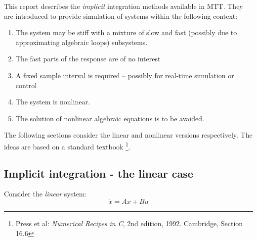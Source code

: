 

This report describes the \emph{implicit} integration methods
available in MTT. They are introduced to provide  simulation
of systems within the following context:
\begin{enumerate}
\item The system may be stiff with a mixture of slow and fast
  (possibly due to approximating algebraic loops) subsystems.
\item The fast parts of the response are of no interest
\item A fixed sample interval is required -- possibly for real-time
  simulation or control
\item The system is nonlinear.
\item The solution of nonlinear algebraic equations is to be avaided.
\end{enumerate}

The following sections consider the linear and nonlinear versions
respectively. The ideas are based on a standard textbook
\footnote{Press et al: \emph{Numerical Recipes in C}, 2nd edition,
  1992. Cambridge, Section 16.6}.
 

\subsection{Implicit integration - the linear case}
\label{sec:linear}

Consider the \emph{linear} system:
\begin{equation}
  \label{eq:sys}
    \dot x = A x + B u
\end{equation}

